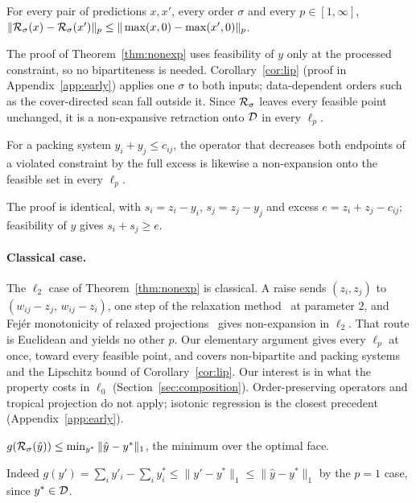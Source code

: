 \begin{corollary}\label{cor:lip}
For every pair of predictions $x, x'$, every order $\sigma$ and every $p \in [1,\infty]$,
$\|\mathcal{R}_\sigma(x) - \mathcal{R}_\sigma(x')\|_p \le \|\max(x,0) - \max(x',0)\|_p$.
\end{corollary}

The proof of Theorem~\ref{thm:nonexp} uses feasibility of $y$ only at the processed constraint, so
no bipartiteness is needed. Corollary~\ref{cor:lip} (proof in Appendix~\ref{app:early}) applies one $\sigma$ to both
inputs; data-dependent orders such as the cover-directed scan fall outside it. Since
$\mathcal{R}_\sigma$ leaves every feasible point unchanged, it is a non-expansive retraction onto $\mathcal{D}$
in every $\ell_p$.

\begin{theorem}\label{thm:pack}
For a packing system $y_i + y_j \le c_{ij}$, the operator that decreases both endpoints of a
violated constraint by the full excess is likewise a non-expansion onto the feasible set in every
$\ell_p$.
\end{theorem}
\noindent The proof is identical, with $s_i = z_i - y_i$, $s_j = z_j - y_j$ and excess
$e = z_i + z_j - c_{ij}$; feasibility of $y$ gives $s_i + s_j \ge e$.

\paragraph{Classical case.} The $\ell_2$ case of Theorem~\ref{thm:nonexp} is classical. A
raise sends $(z_i,z_j)$ to ${(w_{ij}-z_j,\,w_{ij}-z_i)}$, one step of the relaxation
method~\citep{agmon1954,motzkin1954} at parameter $2$, and Fej\'er monotonicity of relaxed
projections~\citep{bauschke1996} gives non-expansion in $\ell_2$. That route is Euclidean and
yields no other $p$. Our elementary argument gives every $\ell_p$ at once, toward every feasible
point, and covers non-bipartite and packing systems and the Lipschitz bound of
Corollary~\ref{cor:lip}. Our interest is in what the property costs in $\ell_0$
(Section~\ref{sec:composition}).
Order-preserving operators and tropical projection do not apply; isotonic regression is the
closest precedent (Appendix~\ref{app:early}).

\begin{corollary}\label{cor:gap}
$g(\mathcal{R}_\sigma(\hat{y})) \le \min_{y^*} \|\hat{y} - y^*\|_1$, the minimum over the optimal face.
\end{corollary}
\noindent Indeed $g(y') = \sum_i y'_i - \sum_i y^*_i \le \|y' - y^*\|_1 \le \|\hat{y} - y^*\|_1$ by
the $p=1$ case, since $y^* \in \mathcal{D}$.

